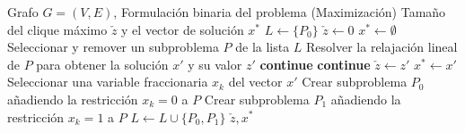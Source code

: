 \begin{algorithm}
\caption{Ramificación y Acotamiento (Branch \& Bound) para el MCP}
\label{alg:branch_bound_mcp}
\begin{algorithmic}[1]
\Require Grafo $G=(V,E)$, Formulación binaria del problema (Maximización)
\Ensure Tamaño del clique máximo $\check{z}$ y el vector de solución $x^*$
\State $L \gets \{ P_0 \}$ 
\State $\check{z} \gets 0$ 
\State $x^* \gets \emptyset$ 
    \State Seleccionar y remover un subproblema $P$ de la lista $L$
    \State Resolver la relajación lineal de $P$ para obtener la solución $x'$ y su valor $z'$
        \State \textbf{continue} 
    \EndIf
        \State \textbf{continue} 
    \EndIf
        \State $\check{z} \gets z'$ 
        \State $x^* \gets x'$
    \Else
        \State Seleccionar una variable fraccionaria $x_k$ del vector $x'$
        \State Crear subproblema $P_0$ añadiendo la restricción $x_k = 0$ a $P$
        \State Crear subproblema $P_1$ añadiendo la restricción $x_k = 1$ a $P$
        \State $L \gets L \cup \{ P_0, P_1 \}$ 
    \EndIf
\EndWhile
\State \Return $\check{z}, x^*$
\end{algorithmic}
\end{algorithm}